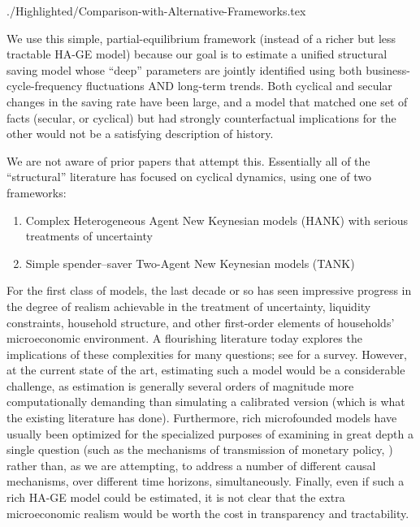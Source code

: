 \documentclass[titlepage]{\econtex}
\begin{document}
\begin{verbatimwrite}{./Highlighted/Comparison-with-Alternative-Frameworks.tex}

We use this simple, partial-equilibrium framework (instead of a richer but less tractable HA-GE model) because our goal is to estimate a unified structural saving model whose ``deep'' parameters are jointly identified using both business-cycle-frequency fluctuations AND long-term trends.  Both cyclical and secular changes in the saving rate have been large, and a model that matched one set of facts (secular, or cyclical) but had strongly counterfactual implications for the other would not be a satisfying description of history.

We are not aware of prior papers that attempt this.  Essentially all of the ``structural'' literature has focused on cyclical dynamics, using one of two frameworks:
\begin{enumerate}
\item Complex Heterogeneous Agent New Keynesian models (HANK) with serious treatments of uncertainty
    \item Simple spender--saver Two-Agent New Keynesian models (TANK)
\end{enumerate}



\hypertarget{HA-Model-Too-Hard-Right-Now}{}
\hypertarget{HA-Models-Not-Used-Yet-For-Forecasting}{}
For the first class of models, the last decade or so has seen impressive progress in the degree of realism achievable in the treatment of uncertainty, liquidity constraints, household structure, and other first-order elements of households' microeconomic environment. A flourishing literature today 
explores the implications of these complexities for many questions; see \cite{kmpHandbook} for a survey.
However, at the current state of the art, estimating such a model would be a considerable challenge, as estimation is generally several orders of magnitude more computationally demanding than simulating a calibrated version (which is what the existing literature has done).  Furthermore, rich microfounded models have usually been optimized for the specialized purposes of examining in great depth a single question (such as the mechanisms of transmission of monetary policy, \cite{kmvHANK}) rather than, as we are attempting, to address a number of different causal mechanisms, over different time horizons, simultaneously.  Finally, even if such a rich HA-GE model could be estimated, it is not clear that the extra microeconomic realism would be worth the cost in transparency and tractability.


\end{verbatimwrite}
\end{document}
